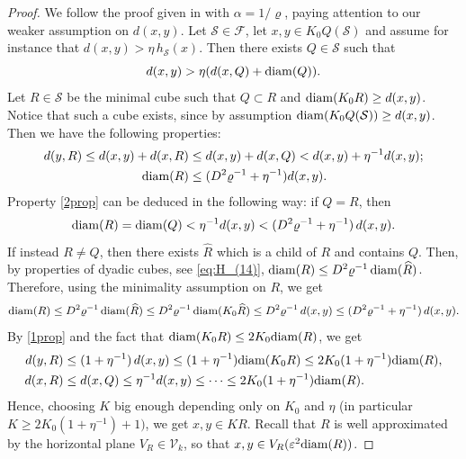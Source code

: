 \documentclass[12pt]{amsart}
\newcommand{\diam}{{\rm diam}}
\renewcommand{\rho}{\varrho}
\numberwithin{equation}{section}
\theoremstyle{plain}
\theoremstyle{definition}
\theoremstyle{remark}
\begin{document}
\begin{proof}
    We follow the proof given in \cite[Lemma 4.3]{Hahlomaa} with $\alpha=1/\varrho$, paying attention to our weaker assumption on $d(x,y)$. Let $\mathcal S\in\mathcal F$, let $x,y\in K_0Q(\mathcal S)$ and assume for instance that $d(x,y)>\eta\,h_\mathcal S(x)$. Then there exists $Q\in\mathcal S$ such that \[d(x,y)>\eta(d(x,Q)+\diam(Q)).\]
    Let $R\in\mathcal S$ be the minimal cube such that $Q\subset R$ and $\diam (K_0R)\geq d(x,y)$. Notice that such a cube exists, since by assumption $\diam(K_0 Q(\mathcal S))\geq d(x,y)$. Then we have the following properties:
    \begin{align}\label{1prop}d(y,R)\leq d(x,y)+d(x,R)&\leq d(x,y)+d(x,Q)<d(x,y)+\eta^{-1}d(x,y);\\ \label{2prop}\diam(R)&\leq (D^2\rho^{-1}+\eta^{-1})d(x,y).\end{align}
    Property \eqref{2prop} can be deduced in the following way: if $Q=R$, then \[\diam(R)=\diam(Q)<\eta^{-1} d(x,y)<(D^2\rho^{-1}+\eta^{-1})\,d(x,y).\] If instead $R\neq Q$, then there exists $\widehat R$ which is a child of $R$ and contains $Q$. Then, by properties of dyadic cubes, see \eqref{eq:H_(14)}, $\diam(R)\leq D^2\rho^{-1}\, \diam(\widehat R)$. Therefore, using the minimality assumption on $R$, we get
    \[\diam(R)\leq D^2\rho^{-1} \,\diam(\widehat R)\leq D^2\rho^{-1} \,\diam(K_0\widehat R)\leq D^2\rho^{-1} \,d(x,y)\leq (D^2\rho^{-1}+\eta^{-1})\,d(x,y).\]
    By \eqref{1prop} and the fact that $\diam(K_0 R)\leq 2K_0\diam(R)$, we get
    \[\begin{split}d(y,R)&\leq (1+\eta^{-1})\,d(x,y)\leq (1+\eta^{-1})\diam(K_0R)\leq 2K_0(1+\eta^{-1})\diam(R),\\ d(x,R)&\leq d(x,Q)\leq \eta^{-1}d(x,y)\leq \dots\leq 2K_0(1+\eta^{-1})\diam(R). \end{split}\] Hence, choosing $K$ big enough depending only on $K_0$ and $\eta$ (in particular $K\geq2K_0(1+\eta^{-1})+1)$, we get $x,y\in KR$. Recall that $R$ is well approximated by the horizontal plane $V_R\in \mathcal V_k$, so that $x,y\in V_R(\varepsilon^2 \diam(R))$. %

\end{proof}
\end{document}
